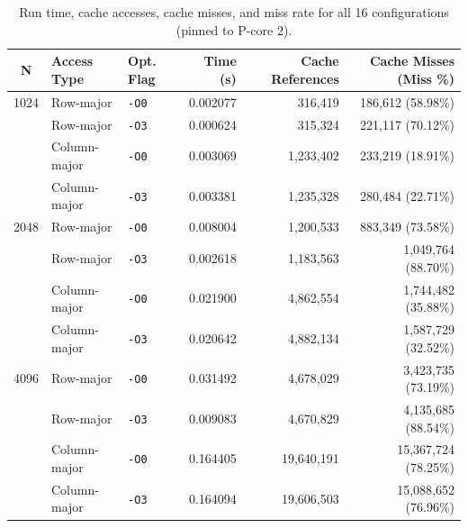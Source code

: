\documentclass[10pt,a4paper]{article}
\begin{document}
\begin{table}[h!]
\centering
\small
\setlength{\tabcolsep}{6pt}
\renewcommand{\arraystretch}{1.15}

\caption{Run time, cache accesses, cache misses, and miss rate for all 16 configurations (pinned to P-core 2).}

\begin{tabular}{c l l r r r}

\toprule
\rowcolor{headerblue}
\color{white}\textbf{N} &
\color{white}\textbf{Access Type} &
\color{white}\textbf{Opt. Flag} &
\color{white}\textbf{Time (s)} &
\color{white}\textbf{Cache References} &
\color{white}\textbf{Cache Misses (Miss \%)} \\
\midrule

1024 & Row-major    & \texttt{-O0} & 0.002077 & 316,419   & 186,612 (58.98\%) \\
     & Row-major    & \texttt{-O3} & 0.000624 & 315,324   & 221,117 (70.12\%) \\
\rowcolor{rowgray}
     & Column-major & \texttt{-O0} & 0.003069 & 1,233,402 & 233,219 (18.91\%) \\
\rowcolor{rowgray}
     & Column-major & \texttt{-O3} & 0.003381 & 1,235,328 & 280,484 (22.71\%) \\

\midrule

2048 & Row-major    & \texttt{-O0} & 0.008004 & 1,200,533  & 883,349   (73.58\%) \\
     & Row-major    & \texttt{-O3} & 0.002618 & 1,183,563  & 1,049,764 (88.70\%) \\
\rowcolor{rowgray}
     & Column-major & \texttt{-O0} & 0.021900 & 4,862,554  & 1,744,482 (35.88\%) \\
\rowcolor{rowgray}
     & Column-major & \texttt{-O3} & 0.020642 & 4,882,134  & 1,587,729 (32.52\%) \\

\midrule

4096 & Row-major    & \texttt{-O0} & 0.031492 & 4,678,029  & 3,423,735  (73.19\%) \\
     & Row-major    & \texttt{-O3} & 0.009083 & 4,670,829  & 4,135,685  (88.54\%) \\
\rowcolor{rowgray}
     & Column-major & \texttt{-O0} & 0.164405 & 19,640,191 & 15,367,724 (78.25\%) \\
\rowcolor{rowgray}
     & Column-major & \texttt{-O3} & 0.164094 & 19,606,503 & 15,088,652 (76.96\%) \\

\midrule


\end{tabular}
\end{table}
\end{document}

